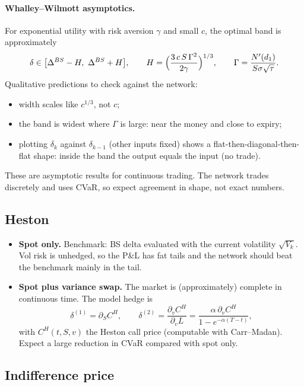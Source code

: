 \documentclass[11pt]{article}
\theoremstyle{definition}
\theoremstyle{remark}
\begin{document}
\paragraph{Whalley--Wilmott asymptotics.} For exponential utility with risk aversion $\gamma$ and small $c$, the
optimal band is approximately
\[
\delta\in\bigl[\Delta^{BS}-H,\ \Delta^{BS}+H\bigr],\qquad
H=\Bigl(\frac{3\,c\,S\,\Gamma^2}{2\gamma}\Bigr)^{1/3},\qquad \Gamma=\frac{N'(d_1)}{S\sigma\sqrt\tau}.
\]
Qualitative predictions to check against the network:
\begin{itemize}[leftmargin=*]
  \item width scales like $c^{1/3}$, not $c$;
  \item the band is widest where $\Gamma$ is large: near the money and close to expiry;
  \item plotting $\delta_k$ against $\delta_{k-1}$ (other inputs fixed) shows a flat-then-diagonal-then-flat shape: inside the band the output equals the input (no trade).
\end{itemize}
These are asymptotic results for continuous trading. The network trades discretely and uses CVaR, so expect
agreement in shape, not exact numbers.

\subsection{Heston}

\begin{itemize}[leftmargin=*]
  \item \textbf{Spot only.} Benchmark: BS delta evaluated with the current volatility $\sqrt{V_k}$. Vol risk is unhedged, so the P\&L
        has fat tails and the network should beat the benchmark mainly in the tail.
  \item \textbf{Spot plus variance swap.} The market is (approximately) complete in continuous time. The model hedge is
        \[
        \delta^{(1)}=\partial_SC^{H},\qquad \delta^{(2)}=\frac{\partial_vC^{H}}{\partial_vL}=\frac{\alpha\,\partial_vC^{H}}{1-e^{-\alpha(T-t)}},
        \]
        with $C^H(t,S,v)$ the Heston call price (computable with Carr--Madan). Expect a large reduction in CVaR compared with spot only.
\end{itemize}

\subsection{Indifference price}
\end{document}
